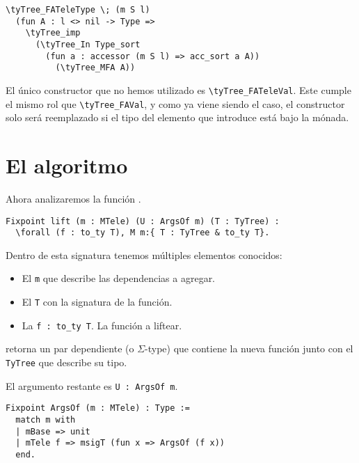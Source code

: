 \begin{lstlisting}[frame=tb,caption={Signatura en \lstinline{TyTree} de \lstinline{ret^}},label=lst:exmp_ret_tytree]
\tyTree_FATeleType \; (m S l)
  (fun A : l <> nil -> Type =>
    \tyTree_imp
      (\tyTree_In Type_sort
        (fun a : accessor (m S l) => acc_sort a A))
          (\tyTree_MFA A))
\end{lstlisting}

El único constructor que no hemos utilizado es \lstinline{\tyTree_FATeleVal}.
Este cumple el mismo rol que \lstinline{\tyTree_FAVal}, y como ya viene siendo el caso, el constructor solo será reemplazado si el tipo del elemento que introduce está bajo la mónada.

\section{El algoritmo}

Ahora analizaremos la función \lift.

\begin{lstlisting}[frame=tb,caption={Signatura de \lift},label=lst:tipo_lift]
Fixpoint lift (m : MTele) (U : ArgsOf m) (T : TyTree) :
  \forall (f : to_ty T), M m:{ T : TyTree & to_ty T}.
\end{lstlisting}

Dentro de esta signatura tenemos múltiples elementos conocidos:
\begin{itemize}
  \item El  \lstinline{m} que describe las dependencias a agregar.
  \item El  \lstinline{T} con la signatura de la función.
  \item La  \lstinline{f : to_ty T}. La función a liftear.
\end{itemize}

\lift retorna un par dependiente (o $\Sigma$-type) que contiene la nueva función junto con el \lstinline{TyTree} que describe su tipo.

El argumento restante es \lstinline{U : ArgsOf m}.

\begin{lstlisting}[frame=tb,caption={Definición de \lstinline{ArgsOf}},label=lst:ArgsOf]
Fixpoint ArgsOf (m : MTele) : Type :=
  match m with
  | mBase => unit
  | mTele f => msigT (fun x => ArgsOf (f x))
  end.
\end{lstlisting}

